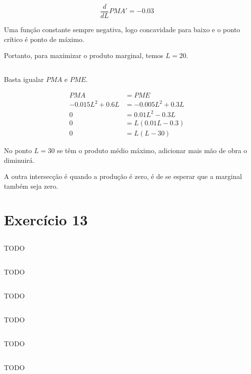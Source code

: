 \documentclass{article}
\begin{document}
\[
	\frac{d}{dL}PMA' = - 0.03
\]

Uma função constante sempre negativa, logo concavidade para baixo e o ponto
crítico é ponto de máximo.

Portanto, para maximizar o produto marginal, temos \(L = 20\).

\subsection{}

Basta igualar \(PMA\) e \(PME\).

\[
	\begin{aligned}
		PMA              & = PME              \\
		-0.015L^2 + 0.6L & = -0.005L^2 + 0.3L \\
		0                & = 0.01L^2 - 0.3L   \\
		0                & = L(0.01L - 0.3)   \\
		0                & = L(L - 30) 
	\end{aligned}
\]

No ponto \(L=30\) se têm o produto médio máximo, adicionar mais mão de obra o
diminuirá.

A outra intersecção é quando a produção é zero, é de se esperar que a marginal
também seja zero.

\section{Exercício 13}
\subsection{}
TODO
\subsection{}
TODO
\subsection{}
TODO
\subsection{}
TODO
\subsection{}
TODO
\subsection{}
TODO
\end{document}
